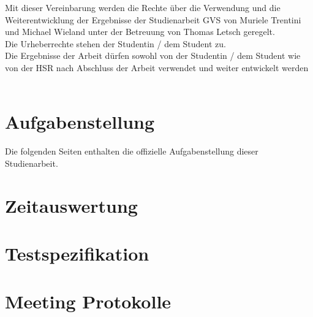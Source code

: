 \documentclass[11pt,a4paper,english,oneside]{book}
\numberwithin{equation}{chapter}
\begin{document}
	Mit dieser Vereinbarung werden die Rechte über die Verwendung und die Weiterentwicklung der Ergebnisse der Studienarbeit GVS von Muriele Trentini und Michael Wieland unter der Betreuung von Thomas Letsch geregelt.\\
	Die Urheberrechte stehen der Studentin / dem Student zu.\\
	Die Ergebnisse der Arbeit dürfen sowohl von der Studentin / dem Student wie von der HSR nach Abschluss der Arbeit verwendet und weiter entwickelt werden\\[2cm]
	 \hfill {}
	\hfill \\[2cm]
	 \hfill {}
	
	\chapter{Aufgabenstellung}
	\label{aufgabenstellung}
	Die folgenden Seiten enthalten die offizielle Aufgabenstellung dieser Studienarbeit.
	
    

	
	\chapter{Zeitauswertung}
	\label{zeitauswertung}
	
	\chapter{Testspezifikation}
	
	\chapter{Meeting Protokolle}
	
	
	
\end{document}

